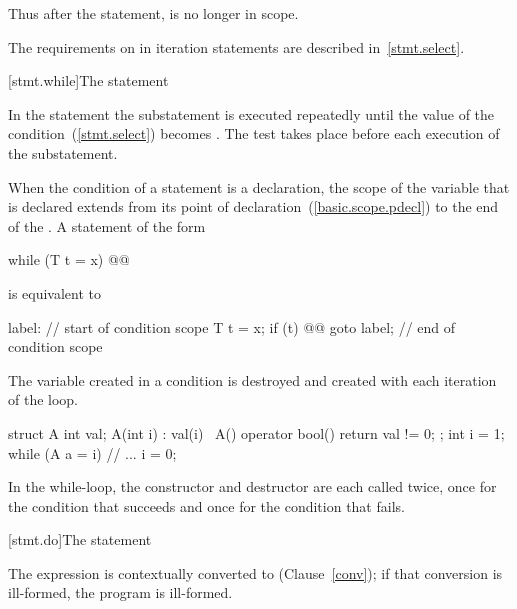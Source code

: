 \pnum
Thus after the  statement,  is no longer in scope.
\exitexample

\pnum
\enternote
The requirements on  in iteration statements are
described in~\ref{stmt.select}.
\exitnote

[stmt.while]{The  statement}%

\pnum
In the  statement the substatement is executed repeatedly
until the value of the condition~(\ref{stmt.select}) becomes
. The test takes place before each execution of the
substatement.

\pnum
{}%
When the condition of a  statement is a declaration, the scope of
the variable that is declared extends from its point of
declaration~(\ref{basic.scope.pdecl}) to the end of the 
. A  statement of the form

\begin{codeblock}
while (T t = x) @@
\end{codeblock}

is equivalent to

\begin{codeblock}
label:
{                   // start of condition scope
  T t = x;
  if (t) {
    @@
    goto label;
  }
}                   // end of condition scope
\end{codeblock}

The variable created in a condition is destroyed and created with each
iteration of the loop.
\enterexample

\begin{codeblock}
struct A {
  int val;
  A(int i) : val(i) { }
  ~A() { }
  operator bool() { return val != 0; }
};
int i = 1;
while (A a = i) {
  // ...
  i = 0;
}
\end{codeblock}

In the while-loop, the constructor and destructor are each called twice,
once for the condition that succeeds and once for the condition that
fails.
\exitexample

[stmt.do]{The  statement}%

\pnum
The expression is contextually converted to  (Clause~\ref{conv});
if that conversion is ill-formed, the program is ill-formed.

